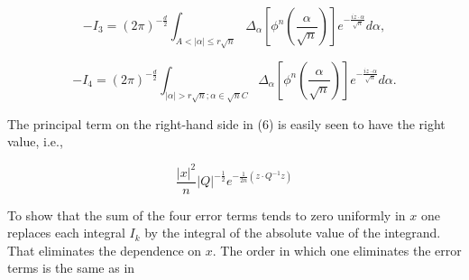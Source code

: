 $$-I_3 = (2\pi)^{-\frac{d}{2}} \int_{A < |\alpha| \leq r \sqrt{n}} \Delta_\alpha \left[ \phi^n \left( \frac{\alpha}{\sqrt{n}} \right) \right] e^{-\frac{iz \cdot \alpha}{\sqrt{n}}} d\alpha,$$

$$-I_4 = (2\pi)^{-\frac{d}{2}} \int_{|\alpha| > r \sqrt{n}; \alpha \in \sqrt{n} C} \Delta_\alpha \left[ \phi^n \left( \frac{\alpha}{\sqrt{n}} \right) \right] e^{-\frac{iz \cdot \alpha}{\sqrt{n}}} d\alpha.$$

The principal term on the right-hand side in (6) is easily seen to have the right value, i.e.,

$$\frac{|x|^2}{n} |Q|^{-\frac{1}{2}} e^{-\frac{1}{2n}(z \cdot Q^{-1} z)}$$

To show that the sum of the four error terms tends to zero uniformly in $x$ one replaces each integral $I_k$ by the integral of the absolute value of the integrand. That eliminates the dependence on $x$. The order in which one eliminates the error terms is the same as in